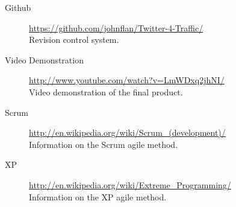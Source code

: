 \begin{description}
    \item[Github] \url{https://github.com/johnflan/Twitter-4-Traffic/} \hfill \\
        Revision control system.
    \item[Video Demonstration] \url{http://www.youtube.com/watch?v=LmWDxq2jhNI/} \hfill \\
        Video demonstration of the final product.
    \item[Scrum] \url{http://en.wikipedia.org/wiki/Scrum_(development)/} \hfill \\
        Information on the Scrum agile method.
    \item[XP] \url{http://en.wikipedia.org/wiki/Extreme_Programming/} \hfill \\
        Information on the XP agile method.
\end{description}
